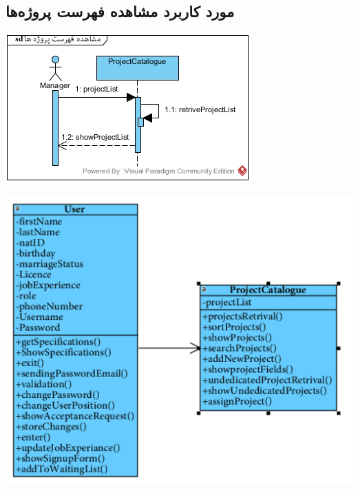 \subsection*{مورد کاربرد مشاهده فهرست پروژه‌ها}
\vspace{2cm}
\begin{center}
\includegraphics[width=\textwidth]{SequenceDiagrams/32.jpg}
\end{center}

\newpage
\vspace{2cm}
\begin{center}
\includegraphics[width=\textwidth]{SequenceClasses/32.png}
\end{center}

\newpage
\vspace{2cm}
